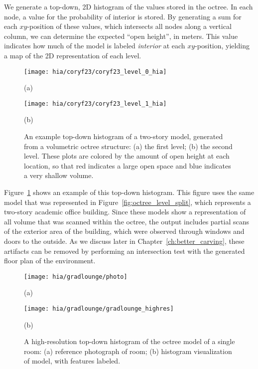 \documentclass[12pt,onecolumn,oneside]{book}
\begin{document}
We generate a top-down, 2D histogram of the values stored in the octree.  In each node, a value for the probability of interior is stored.  By generating a sum for each $xy$-position of these values, which intersects all nodes along a vertical column, we can determine the expected ``open height'', in meters.  This value indicates how much of the model is labeled {\it interior} at each $xy$-position, yielding a map of the 2D representation of each level.

\begin{figure}

	\centering
	\begin{minipage}[t]{0.49\linewidth}
		\centerline{\texttt{[image: hia/coryf23/coryf23\_level\_0\_hia]}}
		\centerline{(a)}
	\end{minipage}
	\hfill
	\begin{minipage}[t]{0.49\linewidth}
		\centerline{\texttt{[image: hia/coryf23/coryf23\_level\_1\_hia]}}
		\centerline{(b)}
	\end{minipage}

	\caption[Top-down histogram of two-story octree model.]{An example top-down histogram of a two-story model, generated from a volumetric octree structure: (a) the first level; (b) the second level.  These plots are colored by the amount of open height at each location, so that red indicates a large open space and blue indicates a very shallow volume.}
	\label{fig:hia_coryf23}
\end{figure}

Figure~\ref{fig:hia_coryf23} shows an example of this top-down histogram.  This figure uses the same model that was represented in Figure~\ref{fig:octree_level_split}, which represents a two-story academic office building.  Since these models show a representation of all volume that was scanned within the octree, the output includes partial scans of the exterior area of the building, which were observed through windows and doors to the outside.  As we discuss later in Chapter~\ref{ch:better_carving}, these artifacts can be removed by performing an intersection test with the generated floor plan of the environment.

\begin{figure}

	\centering
	\begin{minipage}[t]{0.55\linewidth}
		\centerline{\texttt{[image: hia/gradlounge/photo]}}
		\centerline{(a)}
	\end{minipage}
	\hfill
	\begin{minipage}[t]{0.35\linewidth}
		\centerline{\texttt{[image: hia/gradlounge/gradlounge\_highres]}}
		\centerline{(b)}
	\end{minipage}

	\caption[Top-down histogram of single room.]{A high-resolution top-down histogram of the octree model of a single room:  (a) reference photograph of room; (b) histogram visualization of model, with features labeled.}
	\label{fig:hia_gradlounge}
\end{figure}
\end{document}
